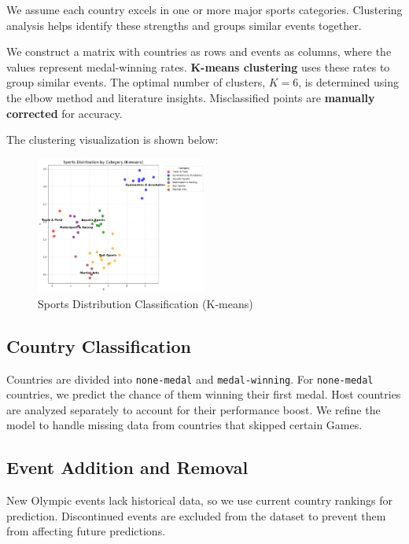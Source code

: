 \documentclass{mcmthesis}  %
\begin{document}
We assume each country excels in one or more major sports categories. Clustering analysis helps identify these strengths and groups similar events together.

We construct a matrix with countries as rows and events as columns, where the values represent medal-winning rates. \textbf{K-means clustering} uses these rates to group similar events. The optimal number of clusters, \textbf{$K=6$}, is determined using the elbow method and literature insights. Misclassified points are \textbf{manually corrected} for accuracy.



The clustering visualization is shown below:

\begin{figure}[h!]
    \centering
    \includegraphics[width=0.5\textwidth]{image/k-means.png}  %
    \caption{Sports Distribution Classification (K-means)}
    \label{fig:sample-image}
\end{figure}

\subsection{Country Classification}
Countries are divided into \texttt{none-medal} and \texttt{medal-winning}. For \texttt{none-medal} countries, we predict the chance of them winning their first medal. Host countries are analyzed separately to account for their performance boost. We refine the model to handle missing data from countries that skipped certain Games.

\subsection{Event Addition and Removal}
New Olympic events lack historical data, so we use current country rankings for prediction. Discontinued events are excluded from the dataset to prevent them from affecting future predictions.
\end{document}
